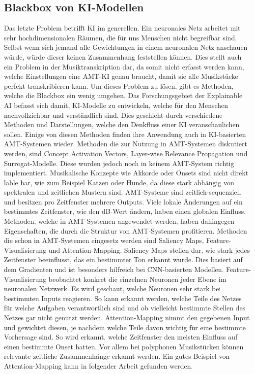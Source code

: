 \subsection{Blackbox von KI-Modellen}
Das letzte Problem betrifft KI im generellen.
Ein neuronales Netz arbeitet mit sehr hochdimensionalen Räumen, die für uns Menschen nicht begreifbar sind.
Selbst wenn sich jemand alle Gewichtungen in einem neuronalen Netz anschauen würde,
würde dieser keinen Zusammenhang feststellen können.
Dies stellt auch ein Problem in der Musiktranskription dar, da somit nicht erfasst werden kann,
welche Einstellungen eine AMT-KI genau braucht,
damit sie alle Musikstücke perfekt transkribieren kann.
Um dieses Problem zu lösen, gibt es Methoden, welche die Blackbox ein wenig umgehen.
Das Forschungsgebiet der Explainable AI befasst sich damit,
KI-Modelle zu entwickeln, welche für den Menschen nachvollziehbar und verständlich sind.
Dies geschieht durch verschiedene Methoden und Darstellungen, welche den Denkfluss einer KI veranschaulichen sollen.
Einige von diesen Methoden finden ihre Anwendung auch in KI-basierten AMT-Systemen wieder.
Methoden die zur Nutzung in AMT-Systemen diskutiert werden, sind Concept Activation Vectors,
Layer-wise Relevance Propagation und Surrogat-Modelle.
Diese wurden jedoch noch in keinem AMT-System richtig implementiert.
Musikalische Konzepte wie Akkorde oder Onsets sind nicht direkt lable bar, wie zum Beispiel Katzen oder Hunde,
da diese stark abhängig von spektralen und zeitlichen Mustern sind.
AMT-Systeme sind zeitlich-sequenziell und besitzen pro Zeitfenster mehrere Outputs.
Viele lokale Änderungen auf ein bestimmtes Zeitfenster, wie den dB-Wert ändern, haben einen globalen Einfluss.
Methoden, welche in AMT-Systemen angewendet werden,
haben dahingegen Eigenschaften, die durch die Struktur von AMT-Systemen profitieren.
Methoden die schon in AMT-Systemen eingesetz werden sind Saliency Maps, Feature-Visualisierung und Attention-Mapping.
Saliency Maps stellen dar, wie stark jedes Zeitfenster beeinflusst, das ein bestimmter Ton erkannt wurde.
Dies basiert auf dem Gradienten und ist besonders hilfreich bei CNN-basierten Modellen.
Feature-Visualisierung beobachtet konkret die einzelnen Neuronen jeder Ebene im neuronalen Netzwerk.
Es wird geschaut, welche Neuronen sehr stark bei bestimmten Inputs reagieren.
So kann erkannt werden, welche Teile des Netzes für welche Aufgaben verantwortlich sind
und ob vielleicht bestimmte Stellen des Netzes gar nicht genutzt werden.
Attention-Mapping nimmt den gegebenen Input und gewichtet diesen,
je nachdem welche Teile davon wichtig für eine bestimmte Vorhersage sind.
So wird erkannt, welche Zeitfenster den meisten Einfluss auf einen bestimmte Onset hatten.
Vor allem bei polyphonen Musikstücken können relevante zeitliche Zusammenhänge erkannt werden.
Ein gutes Beispiel von Attention-Mapping kann in folgender Arbeit gefunden werden.
\cite{cheuk2021revisiting}
